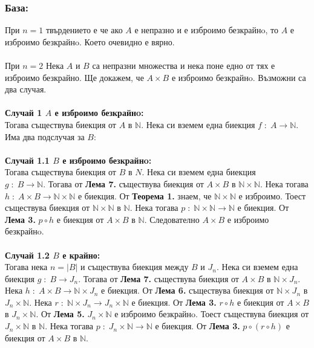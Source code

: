 \documentclass[a4paper, 12pt, oneside]{article}
\newcommand{\N}{\mathbb{N}}
\begin{document}
\subsubsection*{База:}
При \(n = 1\) твърдението е че ако \(A\) е непразно и е изброимо безкрайнo, то \(A\) е изброимо безкрайнo.
Което очевидно е вярно. \\
\hfill \\
\medskip
При \(n = 2\) Нека \(A\) и \(B\) са непразни множества и нека поне едно от тях е изброимо безкрайно.
Ще докажем, че \(A \times B\) е изброимо безкрайнo.
Възможни са два случая. \\
\hfill \\
\medskip
\textbf{Случай 1 \(A\) е изброимо безкрайнo:} \\
Тогава съществува биекция от \(A\) в \(\N\).
Нека си вземем една биекция \(f \; : \; A \to \N\).
Има два подслучая за \(B\): \\
\hfill \\
\medskip
\textbf{Случай 1.1 \(B\) е изброимо безкрайнo:} \\
Тогава съществува биекция от \(B\) в \(N\).
Нека си вземем една биекция \\
\(g \; : \; B \to \N\). Тогава от \textbf{Лема 7.}
съществува биекция от \(A \times B\) в \(\N \times \N\).
Нека тогава \(h \; : \; A \times B \to \N \times \N\) е биекция.
От \textbf{Теорема 1.} знаем, че \(\N \times \N\) е изброимо.
Тоест съществува биекция от \(\N \times \N\) в \(\N\).
Нека тогава \(p \; : \; \N \times \N \to \N\) е биекция.
От \textbf{Лема 3.} \(p \circ h\) е биекция от \(A \times B\) в \(\N\).
Следователно \(A \times B\) е изброимо безкрайнo. \\
\hfill \\
\medskip
\textbf{Случай 1.2 \(B\) е крайно:} \\
Тогава нека \(n = |B|\) и съществува биекция между \(B\) и \(J_n\).
Нека си вземем една биекция \(g \; : \; B \to J_n\).
Тогава от \textbf{Лема 7.} съществува биекция от \(A \times B\) в \(\N \times J_n\).
Нека \(h \; : \; A \times B \to \N \times J_n\) е биекция.
От \textbf{Лема 6.} съществува биекция от \(\N \times J_n\) в \(J_n \times \N\).
Нека \(r \; : \; \N \times J_n \to J_n \times \N\) е биекция.
От \textbf{Лема 3.} \(r \circ h\) е биекция от \(A \times B\) в \(J_n \times \N\).
От \textbf{Лема 5.} \(J_n \times \N\) е изброимо безкрайнo.
Тоест съществува биекция от \(J_n\times \N\) в \(\N\).
Нека тогава \(p \; : \; J_n \times \N \to \N\) е биекция.
От \textbf{Лема 3.} \(p \circ (r \circ h)\) е биекция от \(A \times B\) в \(\N\).
\end{document}
